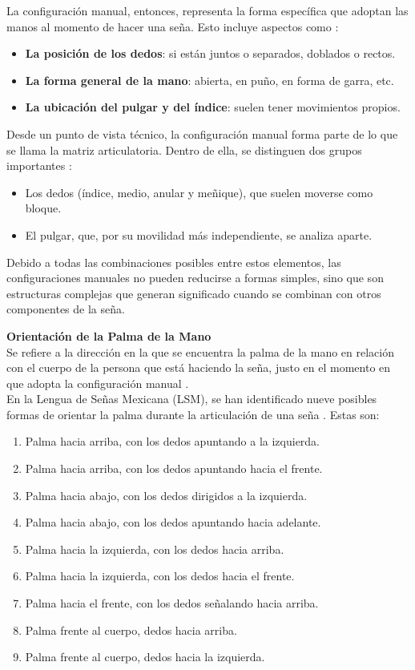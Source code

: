 La configuración manual, entonces, representa la forma específica que adoptan las manos al momento de hacer una seña. Esto incluye aspectos como \cite{ref37}:

\begin{itemize}
    \item \textbf{La posición de los dedos}: si están juntos o separados, doblados o rectos.
    \item \textbf{La forma general de la mano}: abierta, en puño, en forma de garra, etc.
    \item \textbf{La ubicación del pulgar y del índice}: suelen tener movimientos propios.
\end{itemize}

Desde un punto de vista técnico, la configuración manual forma parte de lo que se llama la matriz articulatoria. Dentro de ella, se distinguen dos grupos importantes \cite{ref37}:

\begin{itemize}
    \item Los dedos (índice, medio, anular y meñique), que suelen moverse como bloque.
    \item El pulgar, que, por su movilidad más independiente, se analiza aparte.
\end{itemize}

Debido a todas las combinaciones posibles entre estos elementos, las configuraciones manuales no pueden reducirse a formas simples, sino que son estructuras complejas que generan significado cuando se combinan con otros componentes de la seña.

\newpage

\textbf{Orientación de la Palma de la Mano}\\
Se refiere a la dirección en la que se encuentra la palma de la mano en relación con el cuerpo de la persona que está haciendo la seña, justo en el momento en que adopta la configuración manual \cite{ref37}.\\

En la Lengua de Señas Mexicana (LSM), se han identificado nueve posibles formas de orientar la palma durante la articulación de una seña \cite{ref37}. Estas son:

\begin{enumerate}
    \item Palma hacia arriba, con los dedos apuntando a la izquierda.
    \item Palma hacia arriba, con los dedos apuntando hacia el frente.
    \item Palma hacia abajo, con los dedos dirigidos a la izquierda.
    \item Palma hacia abajo, con los dedos apuntando hacia adelante.
    \item Palma hacia la izquierda, con los dedos hacia arriba.
    \item Palma hacia la izquierda, con los dedos hacia el frente.
    \item Palma hacia el frente, con los dedos señalando hacia arriba.
    \item Palma frente al cuerpo, dedos hacia arriba.
    \item Palma frente al cuerpo, dedos hacia la izquierda.
\end{enumerate}


